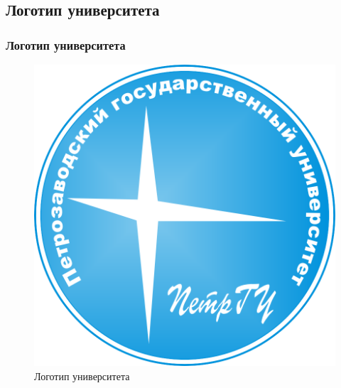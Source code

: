 \subsection{Логотип университета}

\begin{frame}
	\frametitle{Логотип университета}
  
	\begin{figure}
		\includegraphics[width=0.4\linewidth]{images/petrsu_logo_blue.png}
		\caption{Логотип университета}
	\end{figure}
\end{frame}